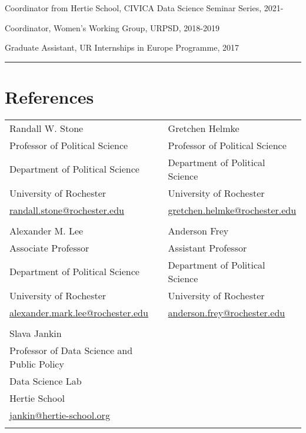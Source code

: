 \documentclass[margin,line,10.95pt]{res}
\begin{document}
\begin{resume}
Coordinator from Hertie School, CIVICA Data Science Seminar Series, 2021-
\vspace*{-3.5mm}

Coordinator, Women's Working Group,  URPSD,  2018-2019
\vspace*{-4.5mm}

Graduate Assistant, UR Internships in Europe Programme,  2017

\begin{center}
	\noindent\rule{8cm}{0.4pt}
\end{center}
\vspace{1em}

\section{\sc References}
\hskip 18pt
\begin{tabular}{ll}
	Randall W. Stone                   & Gretchen Helmke  \\
	Professor of Political Science              & Professor of Political Science\\
	Department of Political Science     & Department of Political Science  \\
	University of Rochester             & University of Rochester \\
\href{mailto:randall.stone@rochester.edu}{randall.stone@rochester.edu}& \href{mailto:gretchen.helmke@rochester.edu}{gretchen.helmke@rochester.edu}\\
\\
	Alexander M. Lee                     & Anderson Frey  \\
	Associate Professor                 & Assistant Professor\\
	Department of Political Science     & Department of Political Science  \\
	University of Rochester             & University of Rochester \\
 \href{mailto:alexander.mark.lee@rochester.edu}{alexander.mark.lee@rochester.edu}&
 	\href{mailto:anderson.frey@rochester.edu}{anderson.frey@rochester.edu}\\
 	\\
 		Slava Jankin                   & \\
 	Professor of Data Science and Public Policy              & \\
 	Data Science Lab     &   \\
 	Hertie School             &  \\
 	\href{mailto:jankin@hertie-school.org}{jankin@hertie-school.org}& \\
 	\\
\end{tabular}



\thispagestyle{updated}

\end{resume}
\end{document}
